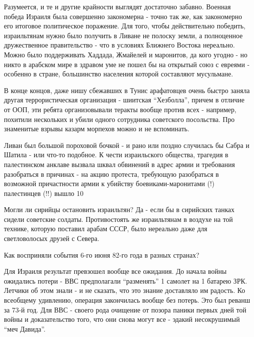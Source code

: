 Разумеется, и те и другие крайности выглядят достаточно забавно. Военная победа Израиля была совершенно закономерна - точно так же, как закономерно его итоговое политическое поражение. Для того, чтобы действительно победить, израильтянам нужно было получить в Ливане не полоску земли, а полноценное дружественное правительство - что в условиях Ближнего Востока нереально. Можно было поддерживать Хаддада, Жмайелей и маронитов, да кого угодно - но никто в арабском мире в здравом уме не пошел бы на открытый союз с евреями - особенно в стране, большинство населения которой составляют мусульмане.

В конце концов, даже нишу сбежавших в Тунис арафатовцев очень быстро заняла другая террористическая организация - шиитская “Хезболла”, причем в отличие от ООП, эти ребята организовывали теракты вообще против всех - например, похитили нескольких и убили одного сотрудника советского посольства. Про знаменитые взрывы казарм морпехов можно и не вспоминать.

Ливан был большой пороховой бочкой - и рано или поздно случилась бы Сабра и Шатила - или что-то подобное. К чести израильского общества, трагедия в палестинском анклаве вызвала шквал обвинений в адрес армии и требования разобраться в причинах - на акцию протеста, требующую разобраться в возможной причастности армии к убийству боевиками-маронитами (!) палестинцев (!!) вышло 10%

Могли ли сирийцы остановить израильтян? Да - если бы в сирийских танках сидели советские солдаты. Противостоять же израильтянам в воздухе на той технике, которую поставил арабам СССР, было нереально даже для светловолосых друзей с Севера.

Как восприняли события 6-го июня 82-го года в разных странах?

Для Израиля результат превзошел вообще все ожидания. До начала войны ожидались потери - ВВС предполагали “разменять” 1 самолет на 1 батарею ЗРК. Летчики об этом знали - и не сказать, что это знание доставляло им радость. Ко всеобщему удивлению, операция закончилась вообще без потерь. Это был реванш за 73-й год. Для ВВС - своего рода очищение от позора паники первых дней той войны и доказательство того, что они снова могут все - эдакий несокрушимый “меч Давида”.

